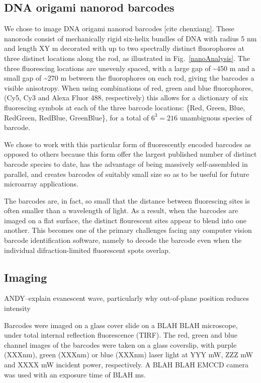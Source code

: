 \subsection{DNA origami nanorod barcodes}
We chose to image DNA origami nanorod barcodes [cite chenxiang]. These nanorods consist of mechanically rigid six-helix bundles of DNA with radius 5 nm and length XY \textmu m decorated with  up to two spectrally distinct fluorophores at three distinct locations along the rod, as illustrated in Fig.~\ref{nanoAnalysis}. The three fluorescing locations are unevenly spaced, with a large gap of \textasciitilde 450 \textmu m and a small gap of \textasciitilde 270 \textmu m  between the fluorophores on each rod, giving the barcodes a visible anisotropy. When using combinations of red, green and blue fluorophores, (Cy5, Cy3 and Alexa Fluor 488, respectively) this allows for a dictionary of six fluorescing symbols at each of the three barcode locations: \{Red, Green, Blue, RedGreen, RedBlue, GreenBlue\}, for a total of $6^{3}=216$  unambiguous species of barcode.

We chose to work with this particular form of fluorescently encoded barcodes as opposed to others because this form offer the largest published number of distinct barcode species to date, has the advantage of being massively self-assembled in parallel, and creates barcodes of suitably small  size so as to be useful for future microarray applications. 

The barcodes are, in fact, so small that the distance between fluorescing sites is often smaller than a wavelength of light. As a result, when the barcodes are imaged on a flat surface, the distinct flourescent sites appear to blend into one another. This becomes one of the primary challenges facing any computer vision barcode identification software, namely to  decode the barcode even when the individual difraction-limited fluorescent spots overlap. 

\subsection{Imaging}
ANDY--explain evanescent wave, particularly why out-of-plane position reduces intensity

Barcodes were imaged on a glass cover slide on a BLAH BLAH microscope,  under total internal reflection fluorescence (TIRF). 
The red, green and blue channel images of the barcodes were taken on a glass coverslip, with purple (XXXnm), green (XXXnm) or blue (XXXnm) laser light at YYY mW, ZZZ mW and XXXX mW incident power, respectively. A BLAH BLAH EMCCD camera was used with an exposure time of BLAH ms.
 

